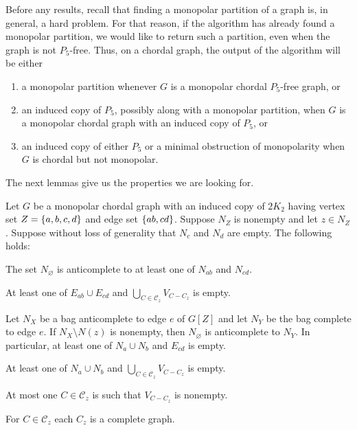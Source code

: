 Before any results, recall that finding a monopolar partition of a graph is, in
general, a hard problem. For that reason, if the algorithm has already found a
monopolar partition, we would like to return such a partition, even when the
graph is not $P_5$-free. Thus, on a chordal graph, the output of the algorithm
will be either
\begin{enumerate}[label=(\roman*)]
    \item a monopolar partition whenever $G$ is a monopolar chordal $P_5$-free
        graph, or
    \item an induced copy of $P_5$, possibly along with a monopolar partition,
    when $G$ is a monopolar chordal graph with an induced copy of $P_5$, or
    \item an induced copy of either $P_5$ or a minimal obstruction of
        monopolarity when $G$ is chordal but not monopolar.
\end{enumerate}

The next lemmas give us the properties we are looking for.

\begin{lemma}
    \label{lem:additionals}
    Let $G$ be a monopolar chordal graph with an induced copy of $2K_2$ having
    vertex set $Z=\left\{a,b,c,d\right\}$ and edge set $\left\{ab,cd\right\}$. Suppose $N_Z$ is
    nonempty and let $z\in N_Z$. Suppose without loss of generality that $N_{c}$
    and $N_{d}$ are empty. The following holds:
    \begin{lemenum}
        \item The set $N_\varnothing$ is anticomplete to at least one of
            $N_{ab}$ and $N_{cd}$. \label{lem:additional_2}
        \item At least one of $E_{ab}\cup E_{cd}$ and
            $\bigcup_{C\in\mathcal{C}_z} V_{C-C_z}$ is empty.
            \label{lem:additional_3}
        \item Let $N_X$ be a bag anticomplete to edge $e$ of $G[Z]$ and let
            $N_Y$ be the bag complete to edge $e$. If $N_X\setminus N(z)$ is
            nonempty, then $N_\varnothing$ is anticomplete to $N_Y$. In
            particular, at least one of $N_a\cup N_b$ and $E_{cd}$ is empty.
            \label{lem:additional_4}
        \item At least one of $N_a\cup N_b$ and $\bigcup_{C\in\mathcal{C}_z}
            V_{C-C_z}$ is empty. \label{lem:additional_1}
        \item At most one $C\in\mathcal{C}_z$ is such that $V_{C-C_z}$ is
            nonempty. \label{lem:additional_5}
        \item For $C\in\mathcal{C}_z$ each $C_z$ is a complete graph.
            \label{lem:additional_6}
    \end{lemenum}
\end{lemma}

